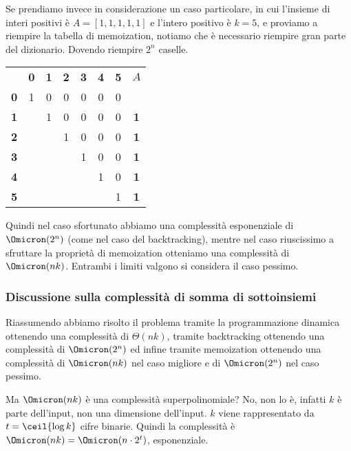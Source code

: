 Se prendiamo invece in considerazione un caso particolare, in cui l'insieme di interi positivi è \(A = [1,1,1,1,1]\) e l'intero positivo è \(k = 5\), e proviamo a riempire la tabella di memoization, notiamo che è necessario riempire gran parte del dizionario.
Dovendo riempire \(2^n\) caselle.

\begin{table}[H]\centering
	\begin{tabular}{@{} c *{6}{@{\hskip 16pt}c} c @{}}
		\toprule
			& \textbf{0} & \textbf{1} & \textbf{2} & \textbf{3} & \textbf{4} & \textbf{5} & \(A\)\\
			\textbf{0} & 1 & 0 & 0 & 0 & 0 & 0\\
		\lightrule
			\textbf{1} &   & 1 & 0 & 0 & 0 & 0 & \textbf{1}\\
		\lightrule
			\textbf{2} &   &   & 1 & 0 & 0 & 0 & \textbf{1}\\
		\lightrule
			\textbf{3} &   &   &   & 1 & 0 & 0 & \textbf{1}\\
		\lightrule
			\textbf{4} &   &   &   &   & 1 & 0 & \textbf{1}\\
		\lightrule
			\textbf{5} &   &   &   &   &   & 1 & \textbf{1}\\
		\bottomrule
	\end{tabular}
\end{table}

Quindi nel caso sfortunato abbiamo una complessità esponenziale di \(\Omicron(2^n)\) (come nel caso del backtracking), mentre nel caso riuscissimo a sfruttare la proprietà di memoization otteniamo una complessità di \(\Omicron(nk)\).
Entrambi i limiti valgono si considera il caso pessimo.

\subsubsection*{Discussione sulla complessità di somma di sottoinsiemi}

Riassumendo abbiamo risolto il problema tramite la programmazione dinamica ottenendo una complessità di \(\Theta(nk)\), tramite backtracking ottenendo una complessità di \(\Omicron(2^n)\) ed infine tramite memoization ottenendo una complessità di \(\Omicron(nk)\) nel caso migliore e di \(\Omicron(2^n)\) nel caso pessimo.

Ma \(\Omicron(nk)\) è una complessità superpolinomiale?
No, non lo è, infatti \(k\) è parte dell'input, non una dimensione dell'input.
\(k\) viene rappresentato da \(t = \ceil{\log k}\) cifre binarie.
Quindi la complessità è \(\Omicron(nk) = \Omicron(n \cdot 2^t)\), esponenziale.

